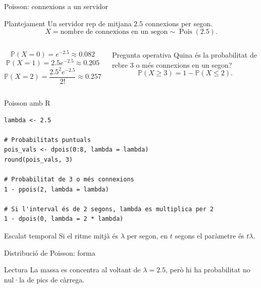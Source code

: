 \documentclass[10pt,aspectratio=169]{beamer}
\newcommand{\Prob}{\mathbb{P}}
\begin{document}
\begin{frame}{Poisson: connexions a un servidor}
\begin{block}{Plantejament}
Un servidor rep de mitjana $2.5$ connexions per segon.
\[
X=\text{nombre de connexions en un segon}\sim \operatorname{Pois}(2.5).
\]
\end{block}
\begin{columns}[T]
\[
\Prob(X=0)=e^{-2.5}\approx 0.082
\]
\[
\Prob(X=1)=2.5e^{-2.5}\approx 0.205
\]
\[
\Prob(X=2)=\frac{2.5^2e^{-2.5}}{2!}\approx 0.257
\]
\begin{alertblock}{Pregunta operativa}
Quina és la probabilitat de rebre 3 o més connexions en un segon?
\[
\Prob(X\geq 3)=1-\Prob(X\leq 2).
\]
\end{alertblock}
\end{columns}
\end{frame}

\begin{frame}[fragile]{Poisson amb R}
\begin{lstlisting}
lambda <- 2.5

# Probabilitats puntuals
pois_vals <- dpois(0:8, lambda = lambda)
round(pois_vals, 3)

# Probabilitat de 3 o més connexions
1 - ppois(2, lambda = lambda)

# Si l'interval és de 2 segons, lambda es multiplica per 2
1 - dpois(0, lambda = 2 * lambda)
\end{lstlisting}

\begin{block}{Escalat temporal}
Si el ritme mitjà és $\lambda$ per segon, en $t$ segons el paràmetre és $t\lambda$.
\end{block}
\end{frame}

\begin{frame}{Distribució de Poisson: forma}
\begin{center}
\end{center}
\begin{alertblock}{Lectura}
La massa es concentra al voltant de $\lambda=2.5$, però hi ha probabilitat no nul·la de pics de càrrega.
\end{alertblock}
\end{frame}
\end{document}

